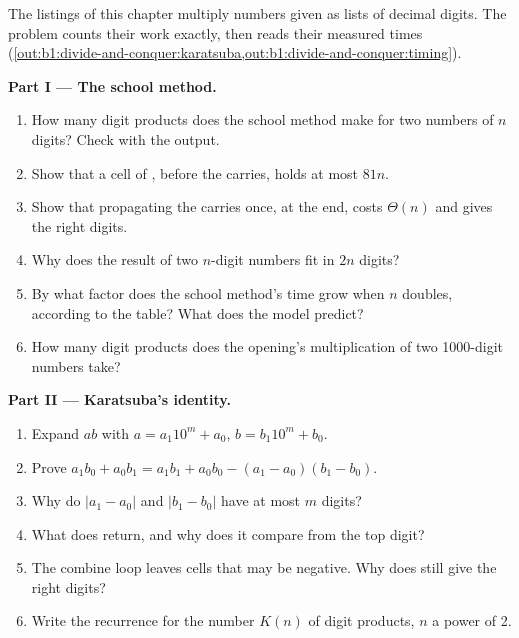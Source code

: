 \begin{problem}\label{pb:b1:divide-and-conquer:1}
The listings of this chapter multiply numbers given as lists of decimal digits. The problem counts their work exactly,
then reads their measured times (\cref{out:b1:divide-and-conquer:karatsuba,out:b1:divide-and-conquer:timing}).

\medskip\noindent\textbf{Part I --- The school method.}
\begin{enumerate}
\item How many digit products does the school method make for two numbers of $n$ digits? Check with the output.
\item Show that a cell of , before the carries, holds at most $81n$.
\item Show that propagating the carries once, at the end, costs $\Theta(n)$ and gives the right digits.
\item Why does the result of two $n$-digit numbers fit in $2n$ digits?
\item By what factor does the school method's time grow when $n$ doubles, according to the table? What does the
model predict?
\item How many digit products does the opening's multiplication of two 1000-digit numbers take?
\end{enumerate}

\medskip\noindent\textbf{Part II --- Karatsuba's identity.}
\begin{enumerate}[resume]
\item Expand $ab$ with $a = a_1 10^m + a_0$, $b = b_1 10^m + b_0$.
\item Prove $a_1 b_0 + a_0 b_1 = a_1 b_1 + a_0 b_0 - (a_1 - a_0)(b_1 - b_0)$.
\item Why do $|a_1 - a_0|$ and $|b_1 - b_0|$ have at most $m$ digits?
\item What does  return, and why does it compare from the top digit?
\item The combine loop leaves cells that may be negative. Why does  still give the right digits?
\item Write the recurrence for the number $K(n)$ of digit products, $n$ a power of 2.
\end{enumerate}


\end{problem}
